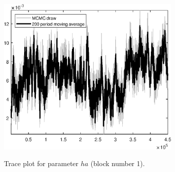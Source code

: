 \begin{figure}[H]
\centering
  \includegraphics[width=0.8\textwidth]{BRS_sectoral_wo_demand_shocks/graphs/TracePlot_ha_blck_1}\\
    \caption{Trace plot for parameter ${ha}$ (block number 1).}
\end{figure}
